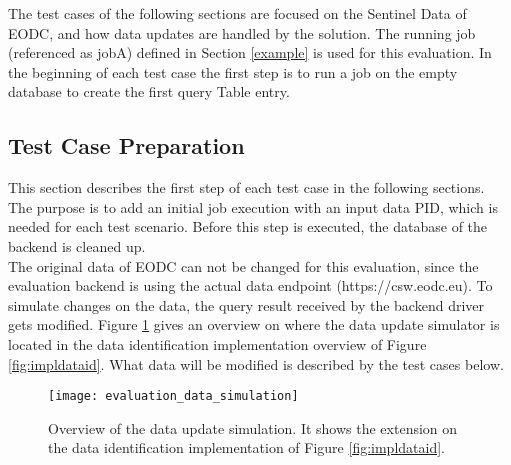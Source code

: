 \documentclass[draft,final]{vutinfth} %
\begin{document}
The test cases of the following sections are focused on the Sentinel Data of EODC, and how data updates are handled by the solution. The running job (referenced as jobA) defined in Section \ref{example} is used for this evaluation. In the beginning of each test case the first step is to run a job on the empty database to create the first query Table entry. 

\subsection{Test Case Preparation}
This section describes the first step of each test case in the following sections. The purpose is to add an initial job execution with an input data PID, which is needed for each test scenario. Before this step is executed, the database of the backend is cleaned up.\\ The original data of EODC can not be changed for this evaluation, since the evaluation backend is using the actual data endpoint (https://csw.eodc.eu). To simulate changes on the data, the query result received by the backend driver gets modified. Figure \ref{fig:eva_data_simulation} gives an overview on where the data update simulator is located in the data identification implementation overview of Figure \ref{fig:impldataid}. What data will be modified is described by the test cases below. \\

\begin{figure}[h]
	\centering
	\texttt{[image: evaluation\_data\_simulation]}
	\caption{Overview of the data update simulation. It shows the extension on the data identification implementation of Figure \ref{fig:impldataid}.}
	\label{fig:eva_data_simulation} %
\end{figure}
\end{document}
